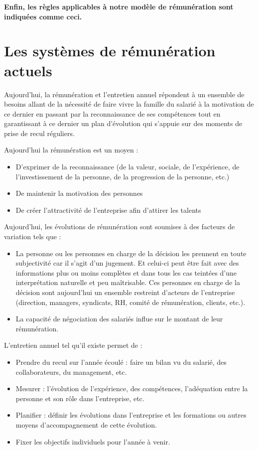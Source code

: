 \documentclass[12pt]{article}
\newcommand{\regle}[1]{%
  \begin{tcolorbox}[colframe=DarkOrange,boxrule=2pt,arc=4pt,left=6pt,right=6pt,top=6pt,bottom=6pt,boxsep=0pt,colback=LightOrange]
  \textbf{#1}
  \end{tcolorbox}
}
\begin{document}
  \regle{Enfin, les règles applicables à notre modèle de rémunération sont indiquées comme ceci.}

\section{Les systèmes de rémunération actuels}
 Aujourd’hui, la rémunération et l'entretien annuel répondent à un ensemble de besoins allant de la nécessité de faire vivre la famille du salarié à la motivation de ce dernier en passant par la reconnaissance de ses compétences tout en garantissant à ce dernier un plan d’évolution qui s’appuie sur des moments de prise de recul réguliers.

Aujourd’hui la rémunération est un moyen :
 \begin{itemize}
   \item D’exprimer de la reconnaissance (de la valeur, sociale, de l’expérience, de l’investissement de la personne, de la progression de la personne, etc.)
   \item De maintenir la motivation des personnes
   \item De créer l’attractivité de l’entreprise afin d’attirer les talents
 \end{itemize}

Aujourd’hui, les évolutions de rémunération sont soumises à des facteurs de variation tels que :
 \begin{itemize}
   \item La personne ou les personnes en charge de la décision les prennent en toute subjectivité car il s’agit d’un jugement. Et celui-ci peut être fait avec des informations plus ou moins complètes et dans tous les cas teintées d’une interprétation naturelle et peu maîtrisable. Ces personnes en charge de la décision sont aujourd’hui un ensemble restreint d’acteurs de l’entreprise (direction, managers, syndicats, RH, comité de rémunération, clients, etc.).
   \item La capacité de négociation des salariés influe sur le montant de leur rémunération.
 \end{itemize}

L'entretien annuel tel qu’il existe permet de : 
 \begin{itemize}
   \item Prendre du recul sur l’année écoulé : faire un bilan vu du salarié, des collaborateurs, du management, etc.
   \item Mesurer : l’évolution de l’expérience, des compétences, l’adéquation entre la personne et son rôle dans l’entreprise, etc.
   \item Planifier : définir les évolutions dans l’entreprise et les formations ou autres moyens d'accompagnement de cette évolution.
   \item Fixer les objectifs individuels pour l’année à venir. 
 \end{itemize}
\end{document}
